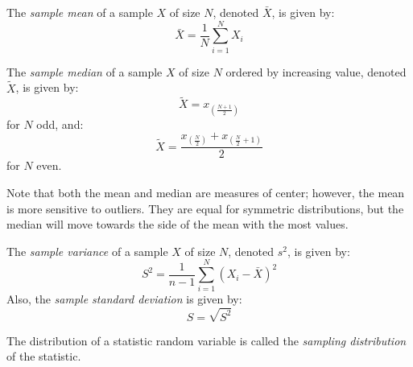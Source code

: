 \documentclass[letterpaper,12pt,fleqn]{article}
\begin{document}
\bigskip

\begin{definition}[Mean]
  The \emph{sample mean} of a sample \(X\) of size \(N\), denoted \(\bar{X}\), is given by:
  \[\bar{X}=\frac{1}{N}\sum_{i=1}^NX_i\]
\end{definition}

\bigskip

\begin{definition}[Median]
  The \emph{sample median} of a sample \(X\) of size \(N\) ordered by increasing value, denoted \(\tilde{X}\), is given by:
  \[\tilde{X}=x_{\left(\frac{N+1}{2}\right)}\]
  for \(N\) odd, and:
  \[\tilde{X}=\frac{x_{\left(\frac{N}{2}\right)}+x_{\left(\frac{N}{2}+1\right)}}{2}\]
  for \(N\) even.
\end{definition}

Note that both the mean and median are measures of center; however, the mean is more sensitive to outliers.  They are equal for
symmetric distributions, but the median will move towards the side of the mean with the most values.

\begin{definition}[Variance]
  The \emph{sample variance} of a sample \(X\) of size \(N\), denoted \(s^2\), is given by:
  \[S^2=\frac{1}{n-1}\sum_{i=1}^N(X_i-\bar{X})^2\]
  Also, the \emph{sample standard deviation} is given by:
  \[S=\sqrt{S^2}\]
\end{definition}

\begin{definition}
  The distribution of a statistic random variable is called the \emph{sampling distribution} of the statistic.
\end{definition}
\end{document}
